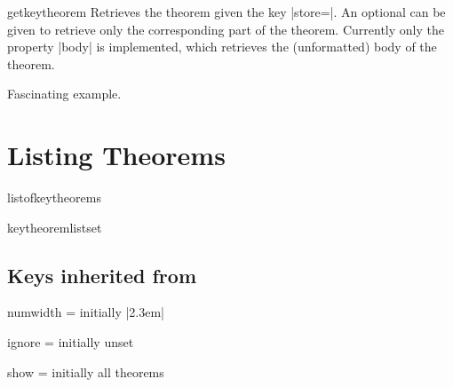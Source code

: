 \documentclass{ltxdoc}
\begin{document}
\begin{docCommand}{getkeytheorem}
  {}
Retrieves the theorem given the key |store=|. An optional  can be given to retrieve only the corresponding part of the theorem. Currently only the property |body| is implemented, which retrieves the (unformatted) body of the theorem.

\begin{keythmscode}[]

\begin{example}[store=mytag]
Fascinating example.
\end{example}

\end{keythmscode}

\end{docCommand}

\section{Listing Theorems}

\begin{docCommand}{listofkeytheorems}
  {}

\end{docCommand}

\begin{docCommand}{keytheoremlistset}
  {}

\end{docCommand}

\begin{keythmscode}[]
\listofkeytheorems
\end{keythmscode}

\subsection{Keys inherited from }

\begin{docKey}{numwidth}
  {=}
  {initially |2.3em|}

\end{docKey}

\begin{docKey}{ignore}
  {=}
  {initially unset}

\end{docKey}

\begin{docKey}{show}
  {=}
  {initially all theorems}

\end{docKey}
\end{document}
